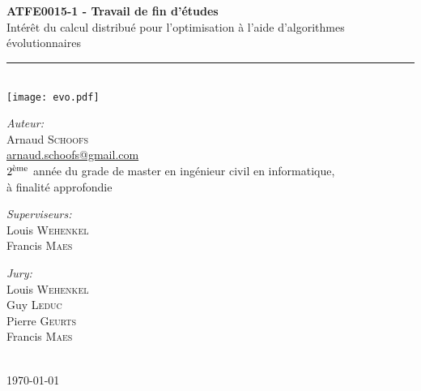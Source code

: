 \documentclass[a4paper, 11pt]{report}
\newcommand{\HRule}{\rule{\linewidth}{0.5mm}}
\begin{document}
\begin{titlepage}

\begin{center}

\begin{figure}
\centering
\mbox{
\hspace{6cm}
}
\end{figure}

\ \\[1cm]

\textbf{\large ATFE0015-1 - Travail de fin d'études}\\[1,5cm]




\huge Intérêt du calcul distribué pour l'optimisation à l'aide d'algorithmes évolutionnaires
\HRule \\[0.4cm]
\texttt{[image: evo.pdf]}


\vfill

\large
\emph{Auteur:}\\
Arnaud \textsc{Schoofs}\\
\href{mailto:arnaud.schoofs@gmail.com}{arnaud.schoofs@gmail.com}\\
\large $2^{\textnormal{ème}}$ année du grade de master en ingénieur civil en informatique,\\
à finalité approfondie \\[1.5cm]

\begin{minipage}{0.4\textwidth}
\begin{flushleft} \large
\emph{Superviseurs:}\\
Louis \textsc{Wehenkel}\\
Francis \textsc{Maes}
\end{flushleft}
\end{minipage}
\begin{minipage}{0.4\textwidth}
\begin{flushright} \large
\emph{Jury:} \\
Louis \textsc{Wehenkel}\\
Guy \textsc{Leduc}\\
Pierre \textsc{Geurts}\\
Francis \textsc{Maes}
\end{flushright}
\end{minipage}

\ \\[1.5cm]

{\large \today}

\end{center}
\end{titlepage}
\end{document}
